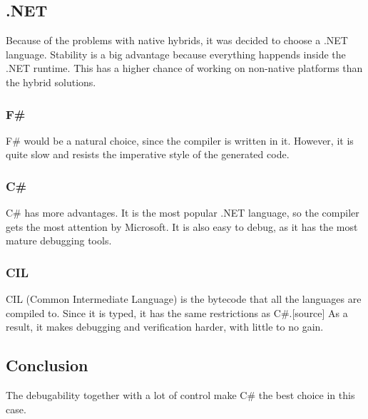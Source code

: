 \subsection{.NET}
Because of the problems with native hybrids, it was decided to choose a .NET language.
Stability is a big advantage because everything happends inside the .NET runtime.
This has a higher chance of working on non-native platforms than the hybrid solutions.

\subsubsection*{F\#}
F\# would be a natural choice, since the compiler is written in it.
However, it is quite slow\cite{fsharp_slow} and resists the imperative style of the generated code.

\subsubsection*{C\#}
C\# has more advantages.
It is the most popular .NET language\cite{Meyerovich}, so the compiler gets the most attention by Microsoft.
It is also easy to debug, as it has the most mature debugging tools.

\subsubsection*{CIL}
CIL (Common Intermediate Language) is the bytecode that all the languages are compiled to.
Since it is typed, it has the same restrictions as C\#.[source]
As a result, it makes debugging and verification harder, with little to no gain.

\subsection{Conclusion}
The debugability together with a lot of control make C\# the best choice in this case.

